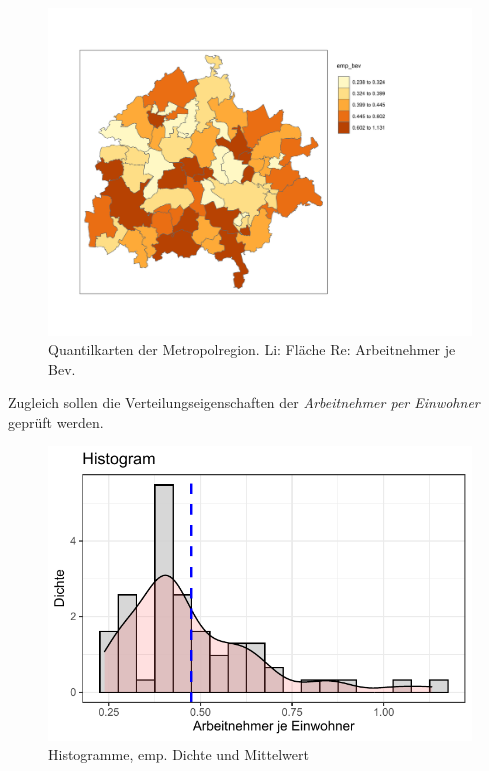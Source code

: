 \begin{figure}
\begin{minipage}[b]{.45\linewidth}
        \includegraphics[scale=0.36,trim={1cm 2cm 1cm 2cm},clip]{body/figures/emp-bev.pdf} %
    \end{minipage}
    \caption{Quantilkarten der Metropolregion. Li: Fläche Re: Arbeitnehmer je Bev.}
    \label{fig_metropol_y}
 \end{figure}

Zugleich sollen die Verteilungseigenschaften der \emph{Arbeitnehmer per Einwohner} geprüft werden.


 \begin{figure}[!ht]
        \setlength{\abovedisplayskip}{0pt}
        \setlength{\belowdisplayskip}{0pt}
        \setlength{\abovedisplayshortskip}{0pt}
        \setlength{\belowdisplayshortskip}{0pt}
        \begin{center}
        \includegraphics[scale=0.8,trim={0.1cm 0.1cm 0.1cm 0.1cm},clip]{body/figures/analysis/Hist-emp_bev.pdf} %
    \end{center}
    \caption[Histogramme ausgewählter Attribute]{Histogramme, emp. Dichte und Mittelwert }
    \label{fig_metropol_hist}
\end{figure}

